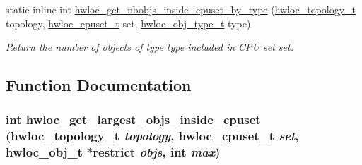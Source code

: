 \begin{DoxyCompactItemize}
static inline int \hyperlink{group__hwlocality__helper__find__inside_ga7e44cec58c6bdb681400a52d007d2597}{hwloc\_\-get\_\-nbobjs\_\-inside\_\-cpuset\_\-by\_\-type} (\hyperlink{group__hwlocality__topology_ga9d1e76ee15a7dee158b786c30b6a6e38}{hwloc\_\-topology\_\-t} topology, \hyperlink{group__hwlocality__cpuset_ga7366332f7090f5b54d4b25a0c2c4b411}{hwloc\_\-cpuset\_\-t} set, \hyperlink{group__hwlocality__types_gacd37bb612667dc437d66bfb175a8dc55}{hwloc\_\-obj\_\-type\_\-t} type)
\begin{DoxyCompactList}\small\item\em Return the number of objects of type {\ttfamily type} included in CPU set {\ttfamily set}. \item\end{DoxyCompactList}\end{DoxyCompactItemize}


\subsection{Function Documentation}
\hypertarget{group__hwlocality__helper__find__inside_ga762bf572ecf691ad812977ce29496ac2}{
\subsubsection[{hwloc\_\-get\_\-largest\_\-objs\_\-inside\_\-cpuset}]{\setlength{\rightskip}{0pt plus 5cm}int hwloc\_\-get\_\-largest\_\-objs\_\-inside\_\-cpuset ({\bf hwloc\_\-topology\_\-t} {\em topology}, \/  {\bf hwloc\_\-cpuset\_\-t} {\em set}, \/  {\bf hwloc\_\-obj\_\-t} $\ast$restrict {\em objs}, \/  int {\em max})}}
\label{group__hwlocality__helper__find__inside_ga762bf572ecf691ad812977ce29496ac2}


